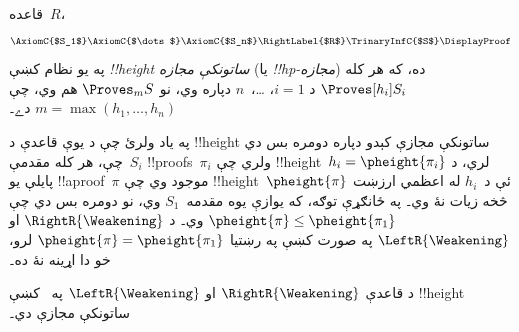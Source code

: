 \documentclass[../../../include/open-logic-section]{subfiles}
\begin{document}
\begin{defn}
قاعده~$R$،
\[
\AxiomC{$S_1$}
\AxiomC{$\dots$}
\AxiomC{$S_n$}
\RightLabel{$R$}
\TrinaryInfC{$S$}
\DisplayProof
\]
په يو نظام کښې \emph{!!{height} ساتونکې مجازه} (يا
\emph{!!{hp}-مجازه}) ده، که هر کله $\Proves[h_i] S_i$ د
$i = 1$، \dots،~$n$ دپاره وي، نو $\Proves_m S$ هم وي، چې
$m = \max(h_1, \dots,
h_n)$ دے۔
\end{defn}

په ياد ولرئ چې د يوې قاعدې د !!{height} ساتونکې مجازې کېدو دپاره
دومره بس دي چې، هر کله مقدمې~$S_i$ !!{proof}s~$\pi_i$ ولري
چې !!{height}~$h_i = \pheight{\pi_i}$ لري،
د پايلې يو !!a{proof}~$\pi$ موجود وي چې !!{height}~$\pheight{\pi}$
ئې د~$h_i$ له اعظمي ارزښت څخه زيات نۀ وي۔ په ځانګړې توګه،
که يوازې يوه مقدمه~$S_1$ وي، نو دومره بس دي چې
$\pheight{\pi} \le \pheight{\pi_1}$ وي۔ د $\RightR{\Weakening}$
او $\LeftR{\Weakening}$ په صورت کښې په رښتيا
$\pheight{\pi} = \pheight{\pi_1}$ لرو، خو دا اړينه نۀ ده۔

\begin{prop}
د  قاعدې $\RightR{\Weakening}$ او $\LeftR{\Weakening}$
په~ کښې !!{height} ساتونکې مجازې دي۔
\end{prop}
\end{document}
